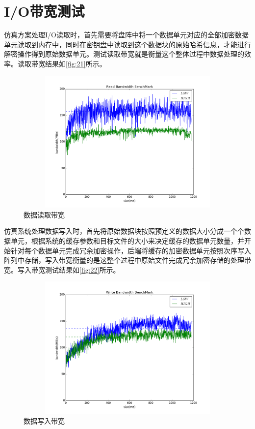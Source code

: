 \section{I/O带宽测试}
仿真方案处理I/O读取时，首先需要将盘阵中将一个数据单元对应的全部加密数据单元读取到内存中，同时在密钥盘中读取到这个数据块的原始哈希信息，才能进行解密操作得到原始数据单元。测试读取带宽就是衡量这个整体过程中数据处理的效率。读取带宽结果如\autoref{fig:21}所示。
\begin{figure}[H]
	\centering
	\includegraphics[width=1\textwidth,height=2.8in]{Pics/figure_bw_r.png}
	\caption{数据读取带宽}
	\label{fig:21}
\end{figure}
仿真系统处理数据写入时，首先将原始数据块按照预定义的数据大小分成一个个数据单元，根据系统的缓存参数和目标文件的大小来决定缓存的数据单元数量，并开始针对每个数据单元完成冗余加密操作，后端将缓存的加密数据单元按照次序写入阵列中存储，写入带宽衡量的是这整个过程中原始文件完成冗余加密存储的处理带宽。写入带宽测试结果如\autoref{fig:22}所示。
\begin{figure}[H]
	\centering
	\includegraphics[width=1\textwidth,height=2.8in]{Pics/figure_bw_w.png}
	\caption{数据写入带宽}
	\label{fig:22}
\end{figure}


